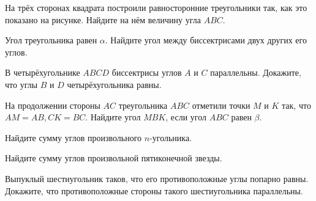 \documentclass{article}
\begin{document}
    \begin{enumerate_boxed}

        \setcounter{enumi}{7}

        \item На трёх сторонах квадрата построили равносторонние треугольники так, как это показано на рисунке.
        Найдите на нём величину угла $ABC$.

        \item Угол треугольника равен $\alpha$.
        Найдите угол между биссектрисами двух других его углов.

        \item В четырёхугольнике $ABCD$ биссектрисы углов $A$ и $C$ параллельны.
        Докажите, что углы $B$ и $D$ четырёхугольника равны.

        \item На продолжении стороны $AC$ треугольника $ABC$ отметили точки $M$ и $K$ так, что $AM = AB, CK = BC$.
        Найдите угол $MBK$, если угол $ABC$ равен $\beta$.

        \item Найдите сумму углов произвольного $n$-угольника.

        \item Найдите сумму углов произвольной пятиконечной звезды.

        \item Выпуклый шестиугольник таков, что его противоположные углы попарно равны.
        Докажите, что противоположные стороны такого шестиугольника параллельны.

    \end{enumerate_boxed}
\end{document}
